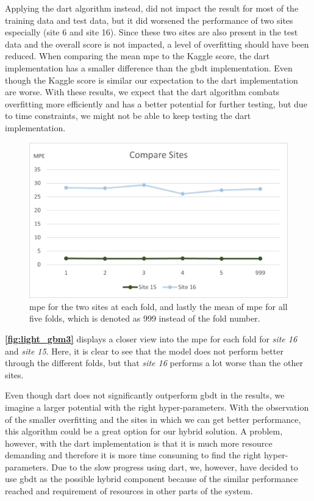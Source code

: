 Applying the \gls{dart} algorithm instead, did not impact the result for most of the training data and test data, but it did worsened the performance of two sites especially (site 6 and site 16). Since these two sites are also present in the test data and the overall score is not impacted, a level of overfitting should have been reduced. When comparing the mean \gls{mpe} to the Kaggle score, the \gls{dart} implementation has a smaller difference than the \gls{gbdt} implementation. Even though the Kaggle score is similar our expectation to the \gls{dart} implementation are worse. With these results, we expect that the \gls{dart} algorithm combats overfitting more efficiently and has a better potential for further testing, but due to time constraints, we might not be able to keep testing the \gls{dart} implementation.

\begin{figure}[H]
    \centering
    \includegraphics[scale=0.6]{Images/Experiments/lightgbm/compare.png}
    \caption{\gls{mpe} for the two sites at each fold, and lastly the mean of \gls{mpe} for all five folds, which is denoted as 999 instead of the fold number.}
    \label{fig:light_gbm3}
\end{figure}

\textbf{\autoref{fig:light_gbm3}} displays a closer view into the \gls{mpe} for each fold for \textit{site 16} and \textit{site 15}. Here, it is clear to see that the model does not perform better through the different folds, but that \textit{site 16} performs a lot worse than the other sites. 

Even though \gls{dart} does not significantly outperform \gls{gbdt} in the results, we imagine a larger potential with the right hyper-parameters. With the observation of the smaller overfitting and the sites in which we can get better performance, this algorithm could be a great option for our hybrid solution. A problem, however, with the \gls{dart} implementation is that it is much more resource demanding and therefore it is more time consuming to find the right hyper-parameters. Due to the slow progress using \gls{dart}, we, however, have decided to use \gls{gbdt} as the possible hybrid component because of the similar performance reached and requirement of resources in other parts of the system.